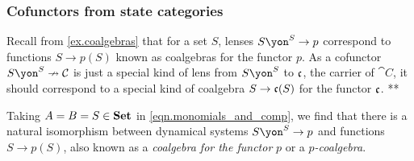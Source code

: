 \documentclass[Book-Poly]{subfiles}
\begin{document}
\subsubsection{Cofunctors from state categories}

\begin{example}

Recall from \cref{ex.coalgebras} that for a set $S$, lenses $S\yon^S\to p$ correspond to functions $S\to p(S)$ known as coalgebras for the functor $p$.
As a cofunctor $S\yon^S\cof\cat{C}$ is just a special kind of lens from $S\yon^S$ to $\mathfrak{c}$, the carrier of $\cat{C}$, it should correspond to a special kind of coalgebra $S\to\mathfrak{c}(S)$ for the functor $\mathfrak{c}$.
**




Taking $A=B=S\in\mathbf{Set}$ in \eqref{eqn.monomials_and_comp}, we find that there is a natural isomorphism between dynamical systems $S\yon^S\to p$ and functions $S\to p(S)$, also known as a \emph{coalgebra for the functor} $p$ or a $p$\emph{-coalgebra}.
\end{example}




\end{document}
